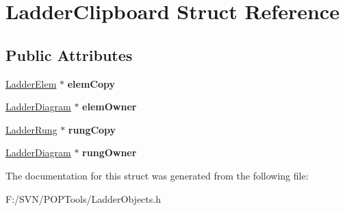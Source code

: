 \hypertarget{struct_ladder_clipboard}{\section{Ladder\-Clipboard Struct Reference}
\label{struct_ladder_clipboard}
}
\subsection*{Public Attributes}
\begin{DoxyCompactItemize}
\item 
\hypertarget{struct_ladder_clipboard_ab60813407a49a93368fd6926e5306fed}{\hyperlink{class_ladder_elem}{Ladder\-Elem} $\ast$ {\bfseries elem\-Copy}}\label{struct_ladder_clipboard_ab60813407a49a93368fd6926e5306fed}

\item 
\hypertarget{struct_ladder_clipboard_a4ebbbd2a40a622cd6524191bdec6b546}{\hyperlink{class_ladder_diagram}{Ladder\-Diagram} $\ast$ {\bfseries elem\-Owner}}\label{struct_ladder_clipboard_a4ebbbd2a40a622cd6524191bdec6b546}

\item 
\hypertarget{struct_ladder_clipboard_af0bc660b4d995cf817a3f432b2851afb}{\hyperlink{struct_ladder_rung}{Ladder\-Rung} $\ast$ {\bfseries rung\-Copy}}\label{struct_ladder_clipboard_af0bc660b4d995cf817a3f432b2851afb}

\item 
\hypertarget{struct_ladder_clipboard_a1f9ffa748eefead4555624eba4025a60}{\hyperlink{class_ladder_diagram}{Ladder\-Diagram} $\ast$ {\bfseries rung\-Owner}}\label{struct_ladder_clipboard_a1f9ffa748eefead4555624eba4025a60}

\end{DoxyCompactItemize}


The documentation for this struct was generated from the following file\-:\begin{DoxyCompactItemize}
\item 
F\-:/\-S\-V\-N/\-P\-O\-P\-Tools/Ladder\-Objects.\-h\end{DoxyCompactItemize}
